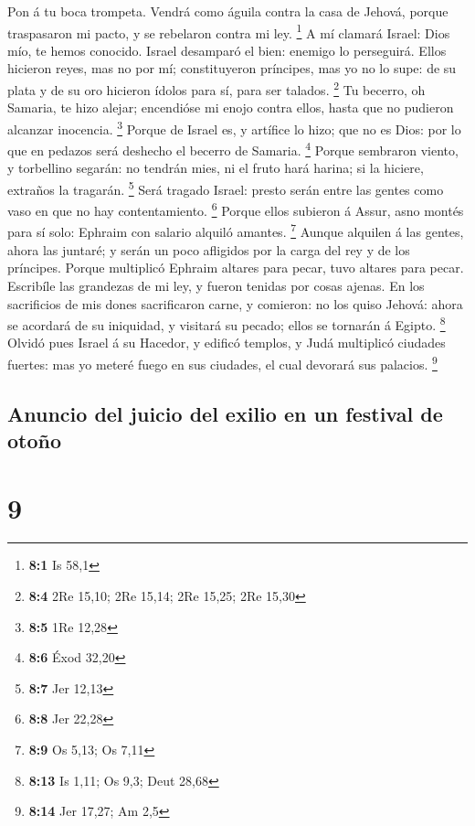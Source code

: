  Pon á tu boca trompeta. Vendrá como águila contra la casa
de Jehová, porque traspasaron mi pacto, y se rebelaron contra mi ley.
\footnote{\textbf{8:1} Is 58,1}  A mí clamará Israel: Dios
mío, te hemos conocido.  Israel desamparó el bien: enemigo
lo perseguirá.  Ellos hicieron reyes, mas no por mí;
constituyeron príncipes, mas yo no lo supe: de su plata y de su oro
hicieron ídolos para sí, para ser talados. \footnote{\textbf{8:4} 2Re
  15,10; 2Re 15,14; 2Re 15,25; 2Re 15,30}  Tu becerro, oh
Samaria, te hizo alejar; encendióse mi enojo contra ellos, hasta que no
pudieron alcanzar inocencia. \footnote{\textbf{8:5} 1Re 12,28}
 Porque de Israel es, y artífice lo hizo; que no es Dios:
por lo que en pedazos será deshecho el becerro de Samaria. \footnote{\textbf{8:6}
  Éxod 32,20}  Porque sembraron viento, y torbellino
segarán: no tendrán mies, ni el fruto hará harina; si la hiciere,
extraños la tragarán. \footnote{\textbf{8:7} Jer 12,13} 
Será tragado Israel: presto serán entre las gentes como vaso en que no
hay contentamiento. \footnote{\textbf{8:8} Jer 22,28} 
Porque ellos subieron á Assur, asno montés para sí solo: Ephraim con
salario alquiló amantes. \footnote{\textbf{8:9} Os 5,13; Os 7,11}
 Aunque alquilen á las gentes, ahora las juntaré; y serán
un poco afligidos por la carga del rey y de los príncipes. 
Porque multiplicó Ephraim altares para pecar, tuvo altares para pecar.
 Escribíle las grandezas de mi ley, y fueron tenidas por
cosas ajenas.  En los sacrificios de mis dones sacrificaron
carne, y comieron: no los quiso Jehová: ahora se acordará de su
iniquidad, y visitará su pecado; ellos se tornarán á Egipto. \footnote{\textbf{8:13}
  Is 1,11; Os 9,3; Deut 28,68}  Olvidó pues Israel á su
Hacedor, y edificó templos, y Judá multiplicó ciudades fuertes: mas yo
meteré fuego en sus ciudades, el cual devorará sus palacios. \footnote{\textbf{8:14}
  Jer 17,27; Am 2,5}

\hypertarget{anuncio-del-juicio-del-exilio-en-un-festival-de-otouxf1o}{%
\subsection{Anuncio del juicio del exilio en un festival de
otoño}\label{anuncio-del-juicio-del-exilio-en-un-festival-de-otouxf1o}}

\hypertarget{section-8}{%
\section{9}\label{section-8}}

